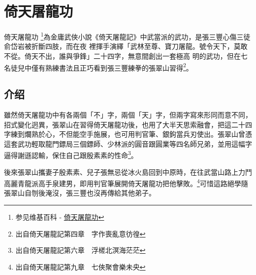 \chapter{倚天屠龍功}
倚天屠龍功
\footnote{参见维基百科 - \href{http://zh.wikipedia.org/wiki/\%E5\%80\%9A\%E5\%A4\%A9\%E5\%B1\%A0\%E9\%BE\%8D\%E5\%8A\%9F}{
    倚天屠龍功}}為金庸武俠小說《倚天屠龍記》中武當派的武功，是張三豐心傷三徒俞岱岩被折斷四肢，而在夜
裡揮手演繹「武林至尊、寶刀屠龍。號令天下，莫敢不從。倚天不出，誰與爭鋒」二十四字，無意間創出一套極高
明的武功，但在七名徒兒中僅有熟練書法且正巧看到張三豐練拳的張翠山習得\footnote{出自倚天屠龍記第四章　字作喪亂意彷徨}。

\section{介绍}

雖然倚天屠龍功中有各兩個「不」字，兩個「天」字，但兩字寫來形同而意不同，招式變化迥異，張翠山在習得倚天屠龍功後，也用了大半天思索融會，把這二十四字練到爛熟於心，不但能空手施展，也可用判官筆、銀鉤當兵刃使出。張翠山曾憑這套武功輕取龍門鏢局三個鏢師、少林派的圓音跟圓業等四名師兄弟，並用這幅字逼得謝遜認輸，保住自己跟殷素素的性命\footnote{出自倚天屠龍記第六章　浮槎北溟海茫茫}。

後來張翠山攜妻子殷素素、兒子張無忌從冰火島回到中原時，在往武當山路上力鬥高麗青龍派高手泉建男，即用判官筆展開倚天屠龍功把他擊敗。\footnote{出自倚天屠龍記第九章　七俠聚會樂未央}可惜這路絕學隨張翠山自刎後淹沒，張三豐也沒再傳給其他弟子。

